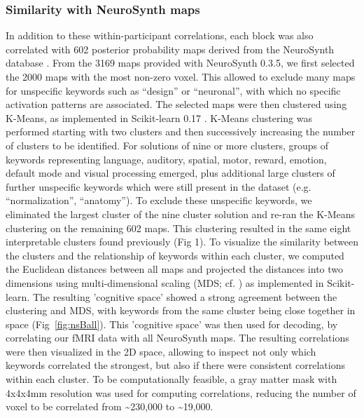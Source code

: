 \documentclass[fleqn,10pt]{SelfArx} %
\begin{document}
\subsubsection*{Similarity with NeuroSynth maps}
In addition to these within-participant correlations, each block was also correlated with 602 posterior probability maps derived from the NeuroSynth database \citep{Yarkoni_2011}. From the 3169 maps provided with NeuroSynth 0.3.5, we first selected the 2000 maps with the most non-zero voxel. This allowed to exclude many maps for unspecific keywords such as “design” or “neuronal”, with which no specific activation patterns are associated. The selected maps were then clustered using K-Means, as implemented in Scikit-learn 0.17 \citep{Pedregosa_2011}. K-Means clustering was performed starting with two clusters and then successively increasing the number of clusters to be identified. For solutions of nine or more clusters, groups of keywords representing language, auditory, spatial, motor, reward, emotion, default mode and visual processing emerged, plus additional large clusters of further unspecific keywords which were still present in the dataset (e.g. “normalization”, “anatomy”). To exclude these unspecific keywords, we eliminated the largest cluster of the nine cluster solution and re-ran the K-Means clustering on the remaining 602 maps. This clustering resulted in the same eight interpretable clusters found previously (Fig 1). To visualize the similarity between the clusters and the relationship of keywords within each cluster, we computed the Euclidean distances between all maps and projected the distances into two dimensions using multi-dimensional scaling (MDS; cf. \citep{Kriegeskorte_2008}) as implemented in Scikit-learn. The resulting 'cognitive space' showed a strong agreement between the clustering and MDS, with keywords from the same cluster being close together in space (Fig~\ref{fig:nsBall}).
This 'cognitive space' was then used for decoding, by correlating our fMRI data with all NeuroSynth maps. The resulting correlations were then visualized in the 2D space, allowing to inspect not only which keywords correlated the strongest, but also if there were consistent correlations within each cluster. To be computationally feasible, a gray matter mask with 4x4x4mm resolution was used for computing correlations, reducing the number of voxel to be correlated from \textasciitilde230,000 to \textasciitilde19,000.
\end{document}
